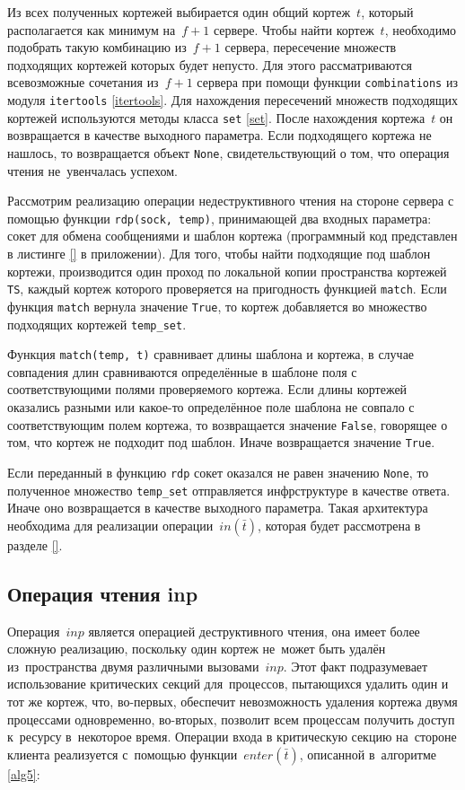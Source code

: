 Из всех полученных кортежей выбирается один общий кортеж~$t$, который располагается как минимум на~$f + 1$ сервере. Чтобы найти кортеж~$t$, необходимо подобрать такую комбинацию из~$f + 1$ сервера, пересечение множеств подходящих кортежей которых будет непусто. Для этого рассматриваются всевозможные сочетания из~$f + 1$ сервера при помощи функции \texttt{combinations} из модуля \texttt{itertools} \ref{itertools}. Для нахождения пересечений множеств подходящих кортежей используются методы класса \texttt{set} \ref{set}. После нахождения кортежа~$t$ он возвращается в качестве выходного параметра. Если подходящего кортежа не нашлось, то возвращается объект \texttt{None}, свидетельствующий о том, что операция чтения не~увенчалась успехом.

Рассмотрим реализацию операции недеструктивного чтения на стороне сервера с помощью функции \texttt{rdp(sock, temp)}, принимающей два входных параметра: сокет для обмена сообщениями и шаблон кортежа (программный код представлен в листинге \ref{} в приложении). Для того, чтобы найти подходящие под шаблон кортежи, производится один проход по локальной копии пространства кортежей \texttt{TS}, каждый кортеж которого проверяется на пригодность функцией \texttt{match}. Если функция \texttt{match} вернула значение \texttt{True}, то кортеж добавляется во множество подходящих кортежей \texttt{temp_set}.

Функция \texttt{match(temp, t)} сравнивает длины шаблона и кортежа, в случае совпадения длин сравниваются определённые в шаблоне поля с соответствующими полями проверяемого кортежа. Если длины кортежей оказались разными или какое-то определённое поле шаблона не совпало с соответствующим полем кортежа, то возвращается значение \texttt{False}, говорящее о том, что кортеж не подходит под шаблон. Иначе возвращается значение \texttt{True}.

Если переданный в функцию \texttt{rdp} сокет оказался не равен значению \texttt{None}, то полученное множество \texttt{temp_set} отправляется инфрструктуре в качестве ответа. Иначе оно возвращается в качестве выходного параметра. Такая архитектура необходима для реализации операции~$in(\bar t)$, которая будет рассмотрена в разделе \ref{}.




\subsection{Операция чтения inp}\label{subsec:8}
Операция~$inp$ является операцией деструктивного чтения, она имеет более сложную реализацию, поскольку один кортеж не~может быть удалён из~пространства двумя различными вызовами~$inp$. Этот факт подразумевает использование критических секций для~процессов, пытающихся удалить один и тот же кортеж, что, во-первых, обеспечит невозможность удаления кортежа двумя процессами одновременно, во-вторых, позволит всем процессам получить доступ к~ресурсу в~некоторое время. Операции входа в критическую секцию на~стороне клиента реализуется с~помощью функции~$enter(\bar t)$, описанной в~алгоритме\,\ref{alg5}:

